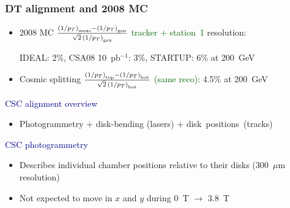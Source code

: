 \documentclass[compress]{beamer}
\begin{document}
\begin{frame}
\frametitle{DT alignment and 2008 MC}

\begin{itemize}\setlength{\itemsep}{0.35 cm}
\item 2008 MC $\frac{\left(1/p_T\right)_{\mbox{\tiny meas}} - \left(1/p_T\right)_{\mbox{\tiny gen}}}{\sqrt{2} \, \left(1/p_T\right)_{\mbox{\tiny gen}}}$ \textcolor{darkgreen}{tracker $+$ station~1} resolution:

\vspace{0.1 cm}
IDEAL: 2\%, CSA08 10~pb$^{-1}$: 3\%, STARTUP: 6\% at 200~GeV
\item Cosmic splitting $\frac{\left(1/p_T\right)_{\mbox{\tiny top}} - \left(1/p_T\right)_{\mbox{\tiny bot}}}{\sqrt{2} \, \left(1/p_T\right)_{\mbox{\tiny bot}}}$ \textcolor{darkgreen}{(same reco)}: 4.5\% at 200~GeV
\end{itemize}

\vspace{0.5 cm}
\hspace{-0.83 cm} \textcolor{darkblue}{\Large CSC alignment overview}

\begin{itemize}
\item Photogrammetry $+$ disk-bending (lasers) $+$ \mbox{disk positions (tracks)\hspace{-1 cm}}
\end{itemize}

\vspace{0.5 cm}
\hspace{-0.83 cm} \textcolor{darkblue}{\Large CSC photogrammetry}

\begin{itemize}
\item Describes individual chamber positions relative to their disks (300~$\mu$m resolution)
\item Not expected to move in $x$ and $y$ during 0~T $\to$ 3.8~T
\end{itemize}
\end{frame}
\end{document}
